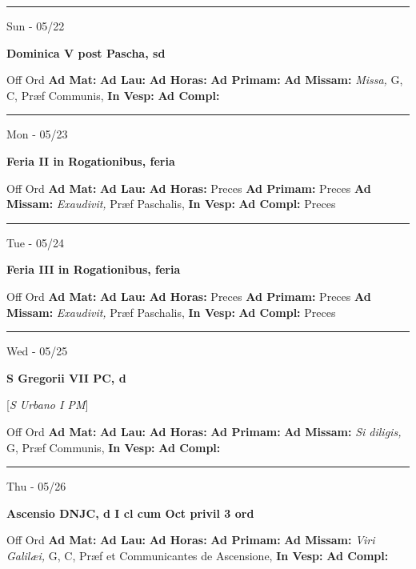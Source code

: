 \documentclass[letterpaper, 10pt]{article}
\begin{document}
\hrule
\begin{center}
Sun - 05/22
\end{center}\textbf{ \large Dominica V post Pascha, \textnormal{\normalsize sd}}
\begin{justify}
Off Ord
\textbf{Ad Mat: }
\textbf{Ad Lau: }
\textbf{Ad Horas: }
\textbf{Ad Primam: }
\textbf{Ad Missam:} \textit{Missa, } G, C, Præf Communis, 
\textbf{In Vesp: }
\textbf{Ad Compl: }\end{justify}



\hrule
\begin{center}
Mon - 05/23
\end{center}\textbf{ \large Feria II in Rogationibus, \textnormal{\normalsize feria}}
\begin{justify}
Off Ord
\textbf{Ad Mat: }
\textbf{Ad Lau: }
\textbf{Ad Horas: }Preces
\textbf{Ad Primam: }Preces
\textbf{Ad Missam:} \textit{Exaudivit, } Præf Paschalis, 
\textbf{In Vesp: }
\textbf{Ad Compl: }Preces\end{justify}



\hrule
\begin{center}
Tue - 05/24
\end{center}\textbf{ \large Feria III in Rogationibus, \textnormal{\normalsize feria}}
\begin{justify}
Off Ord
\textbf{Ad Mat: }
\textbf{Ad Lau: }
\textbf{Ad Horas: }Preces
\textbf{Ad Primam: }Preces
\textbf{Ad Missam:} \textit{Exaudivit, } Præf Paschalis, 
\textbf{In Vesp: }
\textbf{Ad Compl: }Preces\end{justify}



\hrule
\begin{center}
Wed - 05/25
\end{center}\textbf{ \large S Gregorii VII PC, \textnormal{\normalsize d}}

[\textit{S Urbano I PM}]
\begin{justify}
Off Ord
\textbf{Ad Mat: }
\textbf{Ad Lau: }
\textbf{Ad Horas: }
\textbf{Ad Primam: }
\textbf{Ad Missam:} \textit{Si diligis, } G, Præf Communis, 
\textbf{In Vesp: }
\textbf{Ad Compl: }\end{justify}



\hrule
\begin{center}
Thu - 05/26
\end{center}\textbf{ \large Ascensio DNJC, \textnormal{\normalsize d I cl cum Oct privil 3 ord}}
\begin{justify}
Off Ord
\textbf{Ad Mat: }
\textbf{Ad Lau: }
\textbf{Ad Horas: }
\textbf{Ad Primam: }
\textbf{Ad Missam:} \textit{Viri Galilæi, } G, C, Præf et Communicantes de Ascensione, 
\textbf{In Vesp: }
\textbf{Ad Compl: }\end{justify}
\end{document}
